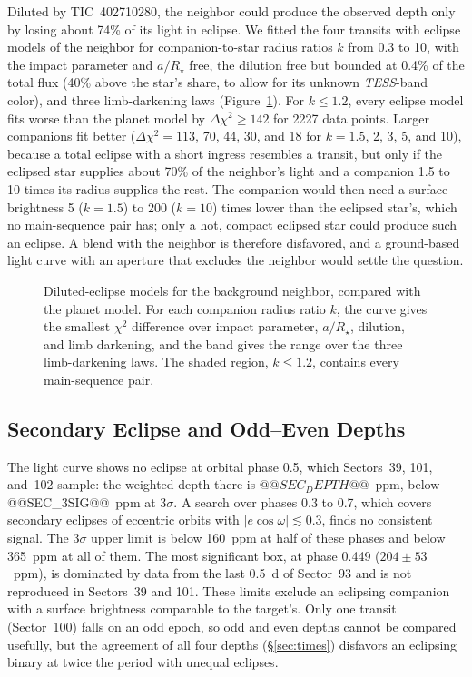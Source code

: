 \documentclass[twocolumn,linenumbers]{aastex701}
\newcommand{\tic}{TIC~402710280}
\newcommand{\tess}{\textit{TESS}}
\begin{document}
Diluted by \tic, the neighbor could produce the observed depth only by losing about 74\% of its light in eclipse. We fitted the four transits with eclipse models of the neighbor for companion-to-star radius ratios $k$ from 0.3 to 10, with the impact parameter and $a/R_\star$ free, the dilution free but bounded at 0.4\% of the total flux (40\% above the star's share, to allow for its unknown \tess-band color), and three limb-darkening laws (Figure~\ref{fig:blend}). For $k \leq 1.2$, every eclipse model fits worse than the planet model by $\Delta\chi^2 \geq 142$ for 2227 data points. Larger companions fit better ($\Delta\chi^2 = 113$, 70, 44, 30, and 18 for $k = 1.5$, 2, 3, 5, and 10), because a total eclipse with a short ingress resembles a transit, but only if the eclipsed star supplies about 70\% of the neighbor's light and a companion 1.5 to 10 times its radius supplies the rest. The companion would then need a surface brightness 5 ($k = 1.5$) to 200 ($k = 10$) times lower than the eclipsed star's, which no main-sequence pair has; only a hot, compact eclipsed star could produce such an eclipse. A blend with the neighbor is therefore disfavored, and a ground-based light curve with an aperture that excludes the neighbor would settle the question.

\begin{figure}
\caption{Diluted-eclipse models for the background neighbor, compared with the planet model. For each companion radius ratio $k$, the curve gives the smallest $\chi^2$ difference over impact parameter, $a/R_\star$, dilution, and limb darkening, and the band gives the range over the three limb-darkening laws. The shaded region, $k \leq 1.2$, contains every main-sequence pair.\label{fig:blend}}
\end{figure}

\subsection{Secondary Eclipse and Odd--Even Depths} \label{sec:secondary}

The light curve shows no eclipse at orbital phase 0.5, which Sectors~39, 101, and~102 sample: the weighted depth there is $@@SEC_DEPTH@@$~ppm, below @@SEC_3SIG@@~ppm at $3\sigma$. A search over phases 0.3 to 0.7, which covers secondary eclipses of eccentric orbits with $|e\cos\omega| \lesssim 0.3$, finds no consistent signal. The $3\sigma$ upper limit is below 160~ppm at half of these phases and below 365~ppm at all of them. The most significant box, at phase 0.449 ($204 \pm 53$~ppm), is dominated by data from the last 0.5~d of Sector~93 and is not reproduced in Sectors~39 and 101. These limits exclude an eclipsing companion with a surface brightness comparable to the target's. Only one transit (Sector~100) falls on an odd epoch, so odd and even depths cannot be compared usefully, but the agreement of all four depths (\S\ref{sec:times}) disfavors an eclipsing binary at twice the period with unequal eclipses.
\end{document}
